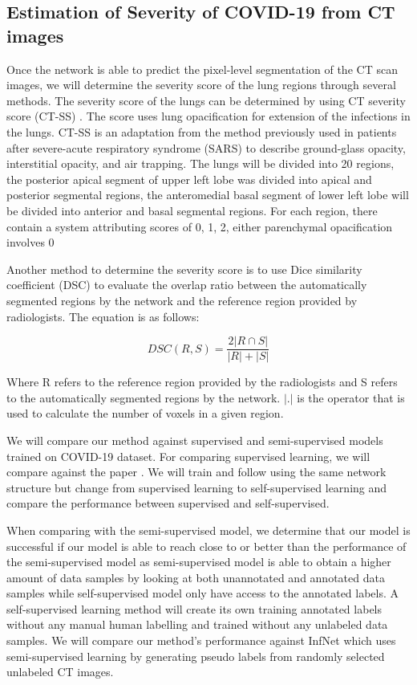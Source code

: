 \subsection{Estimation of Severity of COVID-19 from CT images}
Once the network is able to predict the pixel-level segmentation of the CT scan images, we will determine the severity score of the lung regions through several methods. The severity score of the lungs can be determined by using CT severity score (CT-SS) \cite{ref11}. The score uses lung opacification for extension of the infections in the lungs. CT-SS is an adaptation from the method previously used in patients after severe-acute respiratory syndrome (SARS) \cite{ref10} to describe ground-glass opacity, interstitial opacity, and air trapping. The lungs will be divided into 20 regions, the posterior apical segment of upper left lobe was divided into apical and posterior segmental regions, the anteromedial basal segment of lower left lobe will be divided into anterior and basal segmental regions. For each region, there contain a system attributing scores of 0, 1, 2, either parenchymal opacification involves 0%

Another method to determine the severity score is to use Dice similarity coefficient (DSC) \cite{ref12}  to evaluate the overlap ratio between the automatically segmented regions by the network and the reference region provided by radiologists. The equation is as follows:

\begin{equation}
DSC(R,S)=\frac{2|R\cap S|}{|R|+|S|}
\end{equation}

Where R refers to the reference region provided by the radiologists and S refers to the automatically segmented regions by the network. $|.|$
is the operator that is used to calculate the number of voxels in a given region.

We will compare our method against supervised and semi-supervised \cite{ref13,ref14} models trained on COVID-19 dataset. For comparing supervised learning, we will compare against the paper \cite{ref13}. We will train and follow using the same network structure but change from supervised learning to self-supervised learning and compare the performance between supervised and self-supervised.

When comparing with the semi-supervised model, we determine that our model is successful if our model is able to reach close to or better than the performance of the semi-supervised model as semi-supervised model is able to obtain a higher amount of data samples by looking at both unannotated and annotated data samples while self-supervised model only have access to the annotated labels. A self-supervised learning method will create its own training annotated labels without any manual human labelling and trained without any unlabeled data samples. We will compare our method’s performance against InfNet \cite{ref14} which uses semi-supervised learning by generating pseudo labels from randomly selected unlabeled CT images.

